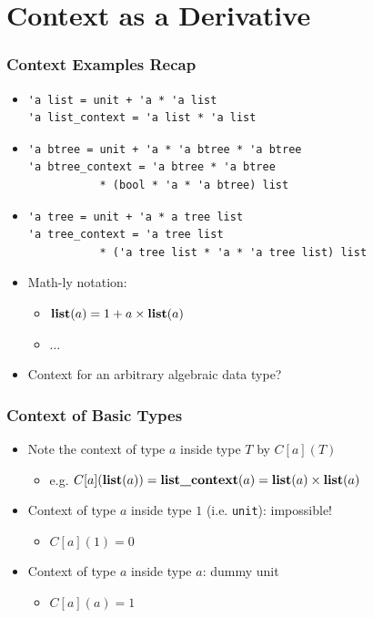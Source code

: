 \section{Context as a Derivative}

\begin{frame}[fragile]
\frametitle{Context Examples Recap}

\begin{itemize}
\item
\begin{lstlisting}
'a list = unit + 'a * 'a list
'a list_context = 'a list * 'a list
\end{lstlisting}

\item
\begin{lstlisting}
'a btree = unit + 'a * 'a btree * 'a btree
'a btree_context = 'a btree * 'a btree
           * (bool * 'a * 'a btree) list
\end{lstlisting}

\item 
\begin{lstlisting}
'a tree = unit + 'a * a tree list
'a tree_context = 'a tree list
           * ('a tree list * 'a * 'a tree list) list
\end{lstlisting}

\item Math-ly notation:
\begin{itemize}
\item $\operatorname{\textbf{list}} (a) = 1 + a \times \operatorname{\textbf{list}} (a)$
\item $\dots$
\end{itemize}

\item Context for an arbitrary algebraic data type?
\end{itemize}
\end{frame}

\begin{frame}[fragile]
\frametitle{Context of Basic Types}

\begin{itemize}
\item Note the context of type $a$ inside type $T$ by $C[a](T)$
\begin{itemize}
\item e.g. $C[a](\operatorname{\textbf{list}}(a)) = \operatorname{\textbf{list\_context}}(a) = \operatorname{\textbf{list}}(a) \times \operatorname{\textbf{list}}(a)$
\end{itemize}

\item Context of type $a$ inside type $1$ (i.e. \lstinline|unit|): impossible!
\begin{itemize}
\item $C[a](1) = 0$
\end{itemize}

\item Context of type $a$ inside type $a$: dummy unit
\begin{itemize}
\item $C[a](a) = 1$
\end{itemize}
\end{itemize}
\end{frame}

